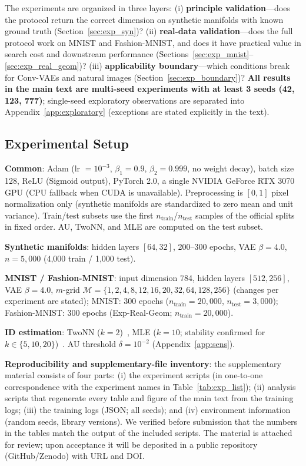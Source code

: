 \documentclass[make,article,submit,pdftex,moreauthors]{Definitions/mdpi}
\begin{document}
The experiments are organized in three layers:
(i) \textbf{principle validation}---does the protocol return the correct
dimension on synthetic manifolds with known ground truth
(Section~\ref{sec:exp_syn})?
(ii) \textbf{real-data validation}---does the full protocol work on MNIST
and Fashion-MNIST, and does it have practical value in search cost and
downstream performance
(Sections~\ref{sec:exp_mnist}--\ref{sec:exp_real_geom})?
(iii) \textbf{applicability boundary}---which conditions break for
Conv-VAEs and natural images (Section~\ref{sec:exp_boundary})?
\textbf{All results in the main text are multi-seed experiments with at
least 3 seeds (42, 123, 777)}; single-seed exploratory observations are
separated into Appendix~\ref{app:exploratory} (exceptions are stated
explicitly in the text).

\subsection{Experimental Setup}\label{sec:exp_setup}

\textbf{Common}: Adam (lr $= 10^{-3}$, $\beta_1 = 0.9$, $\beta_2 = 0.999$,
no weight decay), batch size 128, ReLU (Sigmoid output), PyTorch 2.0, a
single NVIDIA GeForce RTX 3070 GPU (CPU fallback when CUDA is unavailable).
Preprocessing is $[0,1]$ pixel normalization only (synthetic manifolds are
standardized to zero mean and unit variance).
Train/test subsets use the first $n_{\mathrm{train}}$/$n_{\mathrm{test}}$
samples of the official splits in fixed order.
AU, TwoNN, and MLE are computed on the test subset.

\textbf{Synthetic manifolds}: hidden layers $[64, 32]$, 200--300 epochs,
VAE $\beta = 4.0$, $n = 5{,}000$ (4{,}000 train / 1{,}000 test).

\textbf{MNIST / Fashion-MNIST}: input dimension 784, hidden layers
$[512, 256]$, VAE $\beta = 4.0$, $m$-grid
$\mathcal{M} = \{1, 2, 4, 8, 12, 16, 20, 32, 64, 128, 256\}$ (changes per
experiment are stated); MNIST: 300 epochs
($n_{\mathrm{train}} = 20{,}000$, $n_{\mathrm{test}} = 3{,}000$);
Fashion-MNIST: 300 epochs (Exp-Real-Geom; $n_{\mathrm{train}} = 20{,}000$).

\textbf{ID estimation}: TwoNN ($k = 2$)~\cite{facco2017twonn}, MLE
($k = 10$; stability confirmed for $k \in \{5, 10, 20\}$)~\cite{levina2005mle}.
AU threshold $\delta = 10^{-2}$ (Appendix~\ref{app:sens}).

\textbf{Reproducibility and supplementary-file inventory}:
the supplementary material consists of four parts:
(i) the experiment scripts (in one-to-one correspondence with the experiment
names in Table~\ref{tab:exp_list});
(ii) analysis scripts that regenerate every table and figure of the main
text from the training logs;
(iii) the training logs (JSON; all seeds); and
(iv) environment information (random seeds, library versions).
We verified before submission that the numbers in the tables match the
output of the included scripts.
The material is attached for review; upon acceptance it will be deposited in
a public repository (GitHub/Zenodo) with URL and DOI.
\end{document}
